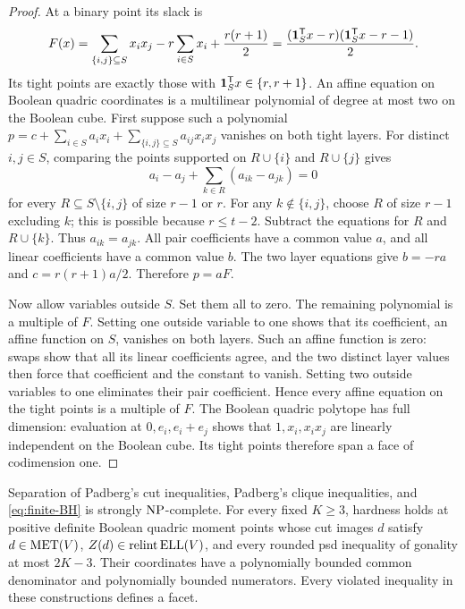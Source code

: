 \begin{proof}
At a binary point its slack is
\[
 F(x)=\sum_{\{i,j\}\subseteq S}x_ix_j-r\sum_{i\in S}x_i+
       \frac{r(r+1)}2
     =\frac{(\mathbf 1_S^{\mathsf T} x-r)(\mathbf 1_S^{\mathsf T} x-r-1)}2.
\]
Its tight points are exactly those with $\mathbf 1_S^{\mathsf T} x\in\{r,r+1\}$.
An affine equation on Boolean quadric coordinates is a multilinear
polynomial of degree at most two on the Boolean cube. First suppose
such a polynomial
$p=c+\sum_{i\in S}a_ix_i+\sum_{\{i,j\}\subseteq S}a_{ij}x_ix_j$
vanishes on both tight layers.
For distinct $i,j\in S$, comparing the points supported on
$R\cup\{i\}$ and $R\cup\{j\}$ gives
\[
 a_i-a_j+\sum_{k\in R}(a_{ik}-a_{jk})=0
\]
for every $R\subseteq S\setminus\{i,j\}$ of size $r-1$ or $r$.
For any $k\notin\{i,j\}$, choose $R$ of size $r-1$ excluding $k$;
this is possible because $r\leq t-2$.
Subtract the equations for $R$ and $R\cup\{k\}$. Thus
$a_{ik}=a_{jk}$. All pair coefficients have a common value $a$,
and all linear coefficients have a common value $b$.
The two layer equations give $b=-ra$ and $c=r(r+1)a/2$.
Therefore $p=aF$.

Now allow variables outside $S$. Set them all to zero. The remaining
polynomial is a multiple of $F$. Setting one outside variable to one
shows that its coefficient, an affine function on $S$, vanishes on
both layers. Such an affine function is zero: swaps show that all
its linear coefficients agree, and the two distinct layer values
then force that coefficient and the constant to vanish.
Setting two outside variables to one eliminates their pair
coefficient. Hence every affine equation on the tight points is a
multiple of $F$. The Boolean quadric polytope has full dimension:
evaluation at $0,e_i,e_i+e_j$ shows that $1,x_i,x_ix_j$ are linearly
independent on the Boolean cube.
Its tight points therefore span a face of codimension one.
\end{proof}

\begin{theorem}\label{thm:finite-families}
Separation of Padberg's cut inequalities, Padberg's clique inequalities,
and \eqref{eq:finite-BH} is strongly $\mathrm{NP}$-complete.
For every fixed $K\geq3$, hardness holds at positive definite Boolean
quadric moment points whose cut images $d$ satisfy
$d\in\operatorname{MET}(V)$, $Z(d)\in\operatorname{relint}\operatorname{ELL}(V)$, and every
rounded psd inequality of gonality at most $2K-3$.
Their coordinates have a polynomially bounded common denominator and
polynomially bounded numerators. Every violated inequality in these
constructions defines a facet.
\end{theorem}

